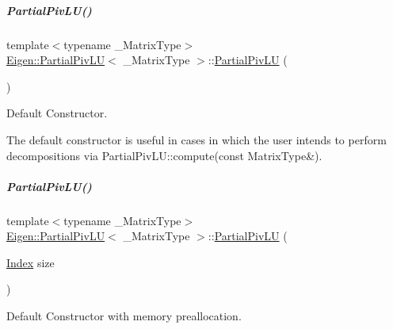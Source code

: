 \mbox{\label{group___l_u___module_a10cba8cef72c8fbbc0dfef98e4e62739}} 
\subparagraph{\texorpdfstring{Partial\+Piv\+L\+U()}{PartialPivLU()}\hspace{0.1cm}{\footnotesize\ttfamily [5/8]}}
{\footnotesize\ttfamily template$<$typename \+\_\+\+Matrix\+Type$>$ \\
\hyperlink{group___l_u___module_class_eigen_1_1_partial_piv_l_u}{Eigen\+::\+Partial\+Piv\+LU}$<$ \+\_\+\+Matrix\+Type $>$\+::\hyperlink{group___l_u___module_class_eigen_1_1_partial_piv_l_u}{Partial\+Piv\+LU} (\begin{DoxyParamCaption}{ }\end{DoxyParamCaption})}



Default Constructor. 

The default constructor is useful in cases in which the user intends to perform decompositions via Partial\+Piv\+L\+U\+::compute(const Matrix\+Type\&). \mbox{\label{group___l_u___module_a3f99c158bd6769f06a000229dc274179}} 
\subparagraph{\texorpdfstring{Partial\+Piv\+L\+U()}{PartialPivLU()}\hspace{0.1cm}{\footnotesize\ttfamily [6/8]}}
{\footnotesize\ttfamily template$<$typename \+\_\+\+Matrix\+Type$>$ \\
\hyperlink{group___l_u___module_class_eigen_1_1_partial_piv_l_u}{Eigen\+::\+Partial\+Piv\+LU}$<$ \+\_\+\+Matrix\+Type $>$\+::\hyperlink{group___l_u___module_class_eigen_1_1_partial_piv_l_u}{Partial\+Piv\+LU} (\begin{DoxyParamCaption}\item[{\hyperlink{group___core___module_a554f30542cc2316add4b1ea0a492ff02}{Index}}]{size }\end{DoxyParamCaption})\hspace{0.3cm}{\ttfamily [explicit]}}



Default Constructor with memory preallocation. 

